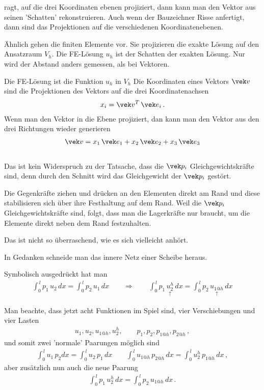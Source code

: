 {ragt, auf die drei Koordinaten ebenen projiziert, dann kann man den Vektor aus seinen 'Schatten' rekonstruieren. Auch wenn der Bauzeichner Risse anfertigt, dann sind das Projektionen auf die verschiedenen Koordinatenebenen.

\"{A}hnlich gehen die finiten Elemente vor. Sie projizieren die exakte L\"{o}sung auf den Ansatzraum $V_h$. Die FE-L\"{o}sung $u_h$ ist der Schatten
der exakten L\"{o}sung. Nur wird der Abstand anders gemessen, als bei Vektoren.

Die FE-L\"{o}sung ist die Funktion $u_h$ in $V_h$
Die Koordinaten eines Vektors $\vek v$ sind die Projektionen des Vektors auf die drei Koordinatenachsen
\begin{align}
x_i = \vek v^T\,\vek e_i\,.
\end{align}
Wenn man den Vektor in die Ebene projiziert,
dan kann man den Vektor aus den drei Richtungen wieder generieren
\begin{align}
\vek  v = x_1 \, \vek e_1 + x_2 \, \vek e_2 + x_3 \, \vek e_3
\end{align}\\

 Das ist kein Widerspruch zu der Tatsache, dass die $\vek p_i$ Gleichgewichtskr\"{a}fte sind, denn durch den Schnitt wird das Gleichgewicht der $\vek p_i$ gest\"{o}rt.

Die Gegenkr\"{a}fte ziehen und dr\"{u}cken an den Elementen direkt am Rand und diese stabilisieren sich \"{u}ber ihre Festhaltung auf dem Rand.
Weil die $\vek p_i$ Gleichgewichtskr\"{a}fte sind, folgt, dass man die Lagerkr\"{a}fte nur braucht, um die Elemente direkt neben dem Rand festzuhalten.

Das ist nicht so \"{u}berraschend, wie es sich vielleicht anh\"{o}rt.

In Gedanken schneide man das innere Netz einer Scheibe heraus.

Symbolisch ausgedr\"{u}ckt hat man
\begin{align}
\int_0^{\,l} p_1\,u_{2}\,dx = \int_0^{\,l} p_2\,u_{1}\,dx \qquad \Rightarrow \qquad \int_0^{\,l} p_1\,\underset{\uparrow}{u_2^h}\,dx = \int_0^{\,l} p_2\,\underset{\uparrow}{u_{1@h}}\,dx
\end{align}


Man beachte, dass jetzt acht Funktionen im Spiel sind, vier Verschiebungen und vier Lasten
\begin{align}
u_1, u_2, u_{1@h}, u_2^h, \qquad  p_1, p_2, p_{1@h}, p_{2@h}\,,
\end{align}
und somit zwei 'normale' Paarungen m\"{o}glich sind
\begin{align}
\int_0^{\,l} u_1 \,p_2 dx = \int_0^{\,l} u_2\,p_1\,dx \qquad \int_0^{\,l} u_{1@h} \,p_{2@h}\,dx = \int_0^{\,l} u_2^h\,p_{1@h}\,dx\,,
\end{align}
aber zus\"{a}tzlich nun auch die neue Paarung
\begin{align}
\int_0^{\,l} p_1\,u_2^h\,dx = \int_0^{\,l} p_2\,u_{1@h}\,dx\,.
\end{align}\\

}
